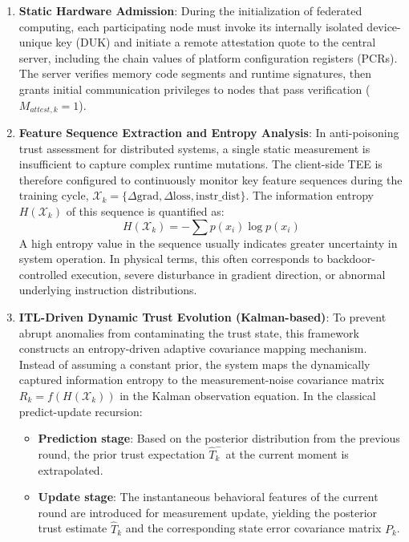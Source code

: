 \documentclass[11pt, a4paper]{article}
\begin{document}
\begin{enumerate}
    \item \textbf{Static Hardware Admission}: During the initialization of federated computing, each participating node must invoke its internally isolated device-unique key (DUK) and initiate a remote attestation quote to the central server, including the chain values of platform configuration registers (PCRs). The server verifies memory code segments and runtime signatures, then grants initial communication privileges to nodes that pass verification ($M_{attest,k}=1$).
    \item \textbf{Feature Sequence Extraction and Entropy Analysis}: In anti-poisoning trust assessment for distributed systems\cite{li2026multidimensional}, a single static measurement is insufficient to capture complex runtime mutations. The client-side TEE is therefore configured to continuously monitor key feature sequences during the training cycle, $\mathcal{X}_k = \{ \Delta \text{grad}, \Delta \text{loss}, \text{instr\_dist} \}$. The information entropy $H(\mathcal{X}_k)$ of this sequence is quantified as:
          \begin{equation}
              H(\mathcal{X}_k) = -\sum p(x_i) \log p(x_i)
          \end{equation}
          A high entropy value in the sequence usually indicates greater uncertainty in system operation. In physical terms, this often corresponds to backdoor-controlled execution, severe disturbance in gradient direction, or abnormal underlying instruction distributions.
    \item \textbf{ITL-Driven Dynamic Trust Evolution (Kalman-based)}: To prevent abrupt anomalies from contaminating the trust state, this framework constructs an entropy-driven adaptive covariance mapping mechanism. Instead of assuming a constant prior, the system maps the dynamically captured information entropy to the measurement-noise covariance matrix $R_k = f(H(\mathcal{X}_k))$ in the Kalman observation equation. In the classical predict-update recursion:
          \begin{itemize}
              \item \textbf{Prediction stage}: Based on the posterior distribution from the previous round, the prior trust expectation $\hat{T}_k^-$ at the current moment is extrapolated.
              \item \textbf{Update stage}: The instantaneous behavioral features of the current round are introduced for measurement update, yielding the posterior trust estimate $\hat{T}_k$ and the corresponding state error covariance matrix $P_k$.
          \end{itemize}
\end{enumerate}
\end{document}
